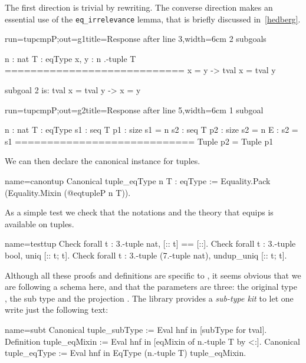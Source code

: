 The first direction is trivial by rewriting.
The converse direction makes an essential use of
the \lstinline/eq_irrelevance/ lemma, that is briefly discussed
in~\ref{hedberg}.

\begin{coqout}{run=tupcmpP;out=g1}{title=Response after line 3,width=6cm}
2 subgoals

n : nat
T : eqType
x, y : n .-tuple T
============================
x = y -> tval x = tval y

subgoal 2 is:
  tval x = tval y -> x = y
$~$
\end{coqout}
\begin{coqout}{run=tupcmpP;out=g2}{title=Response after line 5,width=6cm}
1 subgoal

n : nat
T : eqType
s1 : seq T
p1 : size s1 = n
s2 : seq T
p2 : size s2 = n
E : s2 = s1
============================
Tuple p2 = Tuple p1
\end{coqout}

We can then declare the canonical  instance for tuples.

\begin{coq}{name=canontup}{}
Canonical tuple_eqType n T : eqType :=
  Equality.Pack (Equality.Mixin (@eqtupleP n T)).
\end{coq}

As a simple test we check that the notations and the theory
that equips  is available on tuples.

\begin{coq}{name=testtup}{}
Check forall t : 3.-tuple nat, [:: t] == [::].
Check forall t : 3.-tuple bool, uniq [:: t; t].
Check forall t : 3.-tuple (7.-tuple nat), undup_uniq [:: t; t].
\end{coq}

Although all these proofs and definitions are specific to ,
it seems obvious that we are following a schema here, and that the
parameters are three: the original type , the sub type
 and the projection .
The \mcbMC{} library provides a \emph{sub-type kit} to let one
write just the following text:

\begin{coq}{name=subt}{}
Canonical tuple_subType := Eval hnf in [subType for tval].
Definition tuple_eqMixin := Eval hnf in [eqMixin of n.-tuple T by <:].
Canonical tuple_eqType := Eval hnf in EqType (n.-tuple T) tuple_eqMixin.
\end{coq}

